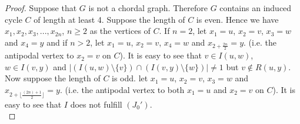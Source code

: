 \documentclass[10pt,a4paper]{article}
\begin{document}
\begin{proof}
Suppose that $G$ is not a chordal graph. Therefore $G$ contains an induced cycle $C$ of length at least 4. Suppose the length of $C$ is even. Hence we have $x_{1}, x_{2}, x_{3}, ..., x_{2n}$, $n\geq 2$ as the vertices of $C$. If $n=2$, let $x_{1}=u$, $x_{2}=v$, $x_{3}=w$ and $x_{4}=y$ and if $n>2$, let $x_{1}=u$, $x_{2}=v$, $x_{4}=w$ and $x_{2+\frac{2n}{2}}=y$. (i.e. the antipodal vertex to $x_{2}=v$ on $C$). 
It is easy to see that  $v\in I(u,w)$, $w\in I(v,y)$ and $|(I(u,w)\setminus \{v\})\cap (I(v,y)\setminus \{w\})|\neq 1$ but $v\notin R(u,y)$. Now suppose the length of $C$ is odd. let $x_{1}=u$, $x_{2}=v$, $x_{3}=w$ and $x_{2+\lfloor\frac{(2n)+1}{2}\rfloor}=y$. (i.e. the antipodal vertex to both $x_{1}=u$ and $x_{2}=v$ on $C$). It is easy to see that $I$ does not fulfill $(J_{0}')$.\\


\end{proof}
\end{document}
